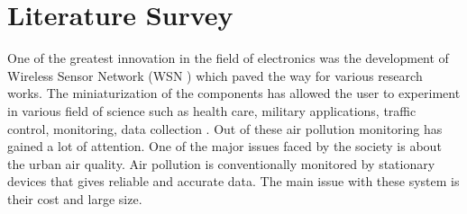 \chapter{Literature Survey}

One of the greatest innovation in the field of electronics was the development of Wireless Sensor Network (WSN ) which paved the way for various research works. The miniaturization of the components has allowed the user to experiment in various field of science such as health care, military applications, traffic control, monitoring, data collection \cite{Khedo2017} \cite{Liu2017}. Out of these air pollution monitoring has gained a lot of attention.  One of the major issues faced by the society is about the urban air quality. Air pollution is conventionally monitored by stationary devices that gives reliable and accurate data. The main issue with these system is their cost and large size.